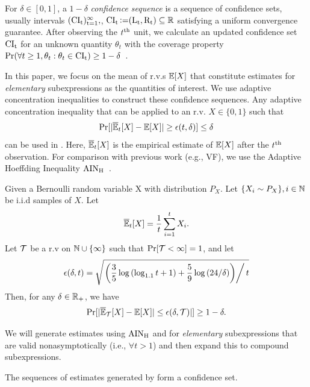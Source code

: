 \begin{definition}
For $\delta \in [0, 1]$, a $1-\delta$ \textit{confidence sequence} is a sequence of confidence sets, usually intervals  $(\rm{CI}_t)_{t=1}^\infty,$, $\rm{CI}_t \operatorname{\vcentcolon=} (L_t, R_t) \subseteq {\mathbb{R}}$
satisfying a uniform convergence guarantee.
After observing the $t^{\rm{th}}$ unit, we calculate an updated confidence set $\rm{CI}_t$ for an unknown quantity $\theta_t$ with the coverage property $\Pr(\forall t \geq 1, \theta_t: \theta_t \in \rm{CI}_t) \geq 1 - \delta$~\citep{howard2021time}.
\end{definition}
\noindent In this paper, we focus on the mean of r.v.s $\mathbb{E}[X]$ that constitute estimates for \textit{elementary} subexpressions as the quantities of interest. 
We use adaptive concentration inequalities to construct these confidence sequences.
Any adaptive concentration inequality that can be applied to an r.v. $X \in \{0, 1\}$ such that 
\begin{equation}
    \Pr[|\overline{\mathbb{E}}_t[X] - \mathbb{E}[X]| \geq \epsilon(t, \delta)] \leq \delta
    \label{eq:adaptive-conc:general}
\end{equation}
can be used in \AVOIRmethodname{}. 
Here, $\overline{\mathbb{E}}_t[X]$ is the empirical estimate of $\mathbb{E}[X]$ after the $t^{\rm{th}}$ observation.
For comparison with previous work (e.g., VF), we use the Adaptive Hoeffding Inequality $\rm{AIN}_H$~\citep{zhao2016adaptive}.
\begin{theorem}[AIN$_H$]
\label{thm:adaptive-stopping}
Given a Bernoulli random variable X with distribution $P_X$. Let $\{X_i \sim P_X\}, i \in \mathbb{N}$ be i.i.d samples of $X$. Let 
\[
\overline{\mathbb{E}}_t[X] = \frac{1}{t}\sum\limits_{i=1}^{t}X_i.
\]
Let ${\mathcal{T}}$ be a r.v  on $\mathbb{N} \cup \{\infty\}$ such that $\Pr[{\mathcal{T}} < \infty] = 1$, and let
\[
    \epsilon(\delta, t) = \sqrt{ \left. \left( \frac{3}{5}\log{(\log_{1.1}{t} + 1)} + \frac{5}{9}\log{(24/\delta)}\right)\right/t}
\]
Then, for any $\delta \in \mathbb{R}_+$, we have
\[
  \Pr[|\overline{\mathbb{E}}_{\mathcal{T}}[X] - \mathbb{E}[X]| \leq \epsilon(\delta, {\mathcal{T}})|] \geq 1 - \delta. 
\]
\end{theorem}
We will generate estimates using $\rm{AIN}_H$ and  for \textit{elementary} subexpressions that are valid nonasymptotically (i.e., $\forall t > 1$) and then expand this to compound subexpressions.

\begin{theorem}
\label{thm:conf-seq}
The sequences of estimates generated by \AVOIRmethodname{} form a confidence set.
\end{theorem}

